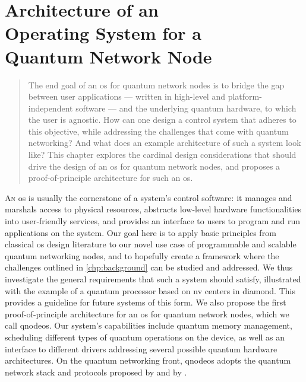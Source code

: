 \chapter
 [Architecture of an Operating System for a Quantum Network Node]
 {Architecture of an\\Operating System for a\\Quantum Network Node}
\label{chp:arch}

\begin{abstract}
The end goal of an \acrfull{os} for quantum network nodes is to bridge the gap between user
applications --- written in high-level and platform-independent software --- and the underlying
quantum hardware, to which the user is agnostic. How can one design a control system that adheres to
this objective, while addressing the challenges that come with quantum networking? And what does an
example architecture of such a system look like? This chapter explores the cardinal design
considerations that should drive the design of an \acrshort{os} for quantum network nodes, and
proposes a proof-of-principle architecture for such an \acrshort{os}.
\end{abstract}



\newpage

\lettrine{A}{n} \acrfull{os} is usually the cornerstone of a system's control software: it manages
and marshals access to physical resources, abstracts low-level hardware functionalities into
user-friendly services, and provides an interface to users to program and run applications on the
system. Our goal here is to apply basic principles from classical \acrshort{os} design literature to
our novel use case of programmable and scalable quantum networking nodes, and to hopefully create a
framework where the challenges outlined in \cref{chp:background} can be studied and addressed. We
thus investigate the general requirements that such a system should satisfy, illustrated with the
example of a quantum processor based on \acrfull{nv} centers in diamond. This provides a guideline
for future systems of this form. We also propose the first proof-of-principle architecture for an
\acrlong{os} for quantum network nodes, which we call \acrshort{qnodeos}. Our system's capabilities
include quantum memory management, scheduling different types of quantum operations on the device,
as well as an interface to different drivers addressing several possible quantum hardware
architectures. On the quantum networking front, \acrshort{qnodeos} adopts the quantum network stack
and protocols proposed by \textcite{dahlberg_2019_egp} and by \textcite{kozlowski_2020_qnp}.

